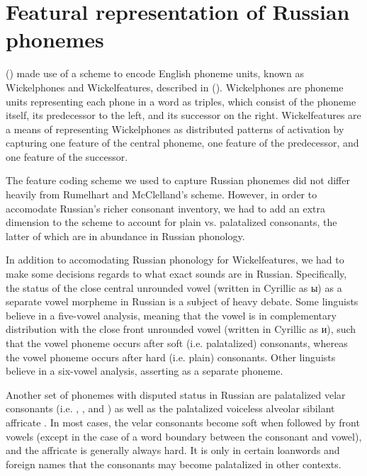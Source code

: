 \documentclass[11pt,a4paper]{article}
\newcommand{\citenp}[1]{\citeauthor{#1} (\citeyear{#1})}
\begin{document}
\section{Featural representation of Russian phonemes}

\citenp{RMcC} made use of a scheme to encode
English phoneme units, known as Wickelphones and Wickelfeatures, described
in \citenp{Wickelgren}. Wickelphones are phoneme units representing
each phone in a word as triples, which consist of the phoneme itself,
its predecessor to the left, and its successor on the right.
Wickelfeatures are a means of representing Wickelphones as distributed
patterns of activation by capturing one feature of the central phoneme,
one feature of the predecessor, and one feature of the successor.

The feature coding scheme we used to capture Russian phonemes did not
differ heavily from Rumelhart and McClelland's scheme. However, in order
to accomodate Russian's richer consonant inventory, we had to add an
extra dimension to the scheme to account for plain vs. palatalized
consonants, the latter of which are in abundance in Russian phonology.

In addition to accomodating Russian phonology for Wickelfeatures, we had to make some
decisions regards to what exact sounds are in Russian. Specifically,
the status of the close central unrounded vowel \textipa{/\textbari/} 
(written in Cyrillic as \foreignlanguage{russian}{ы}) as a separate 
vowel morpheme in Russian is a subject of heavy debate. Some linguists 
believe in a five-vowel analysis, meaning that the vowel \textipa{/\textbari/} 
is in complementary distribution with the close front unrounded vowel 
 (written in Cyrillic as \foreignlanguage{russian}{и}), 
such that the vowel phoneme  occurs after soft (i.e. 
palatalized) consonants, whereas the vowel phoneme \textipa{/\textbari/} 
occurs after hard (i.e. plain) consonants. Other linguists believe in a
six-vowel analysis, asserting \textipa{/\textbari/} as a separate phoneme.

Another set of phonemes with disputed status in Russian are palatalized
velar consonants (i.e. , , 
and ) as well as the palatalized voiceless alveolar
sibilant affricate . In most cases, the velar consonants
become soft when followed by front vowels (except in the case of a word
boundary between the consonant and vowel), and the affricate is generally
always hard. It is only in certain loanwords and foreign names that
the consonants may become palatalized in other contexts.
\end{document}
